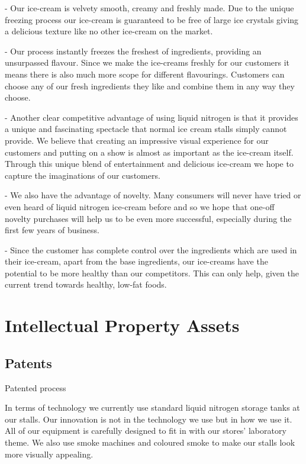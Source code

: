 \documentclass{article}
\begin{document}
 - Our ice-cream is velvety smooth, creamy and freshly made. Due to
the unique freezing process our ice-cream is guaranteed to be free of
large ice crystals giving a delicious texture like no other ice-cream on the
market.

 - Our process instantly freezes the freshest of ingredients, providing
an unsurpassed flavour. Since we make the ice-creams freshly for
our customers it means there is also much more scope for different
flavourings. Customers can choose any of our fresh ingredients they like and combine them in any way they choose.

 - Another clear competitive advantage of using liquid nitrogen is that
it provides a unique and fascinating spectacle that normal ice cream
stalls simply cannot provide. We believe that creating an impressive
visual experience for our customers and putting on a show is almost
as important as the ice-cream itself. Through this unique blend
of entertainment and delicious ice-cream we hope to capture the
imaginations of our customers.

 - We also have the advantage of novelty. Many consumers will never
have tried or even heard of liquid nitrogen ice-cream before and so
we hope that one-off novelty purchases will help us to be even more
successful, especially during the first few years of business.

 - Since the customer has complete control over the ingredients which are used in their ice-cream, apart from the base ingredients, our ice-creams have the potential to be more healthy than our competitors. This can only help, given the current trend towards healthy, low-fat foods.

\section{Intellectual Property Assets}

  \subsection{Patents}
    Patented process

In terms of technology we currently use standard liquid nitrogen storage tanks at our stalls. Our innovation is not in the technology we use but in how we use it. All of our equipment is carefully designed to fit in with our stores' laboratory theme. We also use smoke machines and coloured smoke to make our stalls look more visually appealing.
\end{document}
